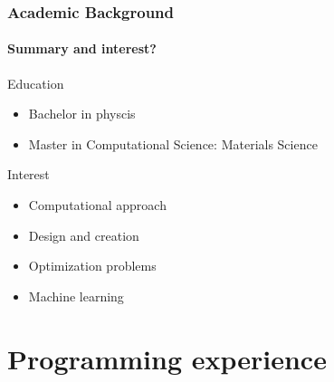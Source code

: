 \documentclass[
	10pt, %
]{beamer}
\begin{document}
\begin{frame}
	\frametitle{Academic Background}
	\framesubtitle{Summary and interest?}

	Education
	\begin{itemize}
		\item Bachelor in physcis 
		\item Master in Computational Science: Materials Science 
	\end{itemize}
	Interest
	\begin{itemize}
		\item Computational approach
		\item Design and creation 
		\item Optimization problems
		\item Machine learning 
	\end{itemize}
\end{frame}


\section{Programming experience}
\end{document}
